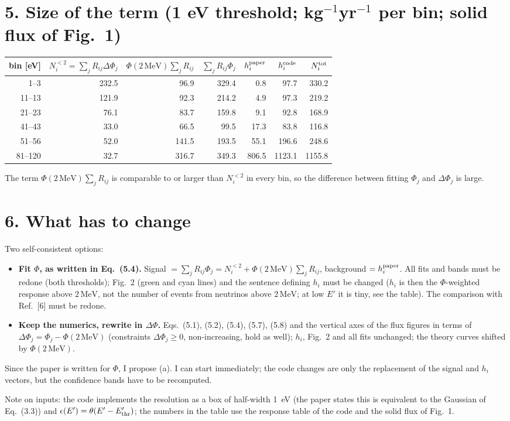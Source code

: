 \documentclass[11pt,a4paper]{article}
\newcommand{\Ep}{E'}
\newcommand{\Phit}{\Phi(2\,\mathrm{MeV})}
\newcommand{\Etwo}{2\,\mathrm{MeV}}
\begin{document}
\section*{5. Size of the term (1 eV threshold; kg$^{-1}$yr$^{-1}$ per bin; solid flux of Fig.~1)}
\begin{center}\small
\begin{tabular}{r rrrrrr}
\toprule
bin [eV] & $N_i^{<2}=\sum_jR_{ij}\Delta\Phi_j$ & $\Phit\sum_jR_{ij}$ & $\sum_jR_{ij}\Phi_j$ & $h_i^{\rm paper}$ & $h_i^{\rm code}$ & $N_i^{\rm tot}$\\
\midrule
   1--3 &   232.5 &    96.9 &   329.4 &     0.8 &    97.7 &   330.2 \\
 11--13 &   121.9 &    92.3 &   214.2 &     4.9 &    97.3 &   219.2 \\
 21--23 &    76.1 &    83.7 &   159.8 &     9.1 &    92.8 &   168.9 \\
 41--43 &    33.0 &    66.5 &    99.5 &    17.3 &    83.8 &   116.8 \\
 51--56 &    52.0 &   141.5 &   193.5 &    55.1 &   196.6 &   248.6 \\
81--120 &    32.7 &   316.7 &   349.3 &   806.5 &  1123.1 &  1155.8 \\
\bottomrule
\end{tabular}
\end{center}
The term $\Phit\sum_jR_{ij}$ is comparable to or larger than $N_i^{<2}$ in every bin, so the difference between fitting
$\Phi_j$ and $\Delta\Phi_j$ is large.

\section*{6. What has to change}
Two self-consistent options:
\begin{itemize}\itemsep1pt
\item[(a)] \textbf{Fit $\Phi$, as written in Eq.~(5.4).} Signal $=\sum_jR_{ij}\Phi_j=N_i^{<2}+\Phit\sum_jR_{ij}$,
background $=h_i^{\rm paper}$. All fits and bands must be redone (both thresholds); Fig.~2 (green and cyan lines) and the sentence
defining $h_i$ must be changed ($h_i$ is then the $\Phi$-weighted response above $\Etwo$, not the number of events from
neutrinos above $\Etwo$; at low $\Ep$ it is tiny, see the table). The comparison with Ref.~[6] must be redone.
\item[(b)] \textbf{Keep the numerics, rewrite in $\Delta\Phi$.} Eqs.~(5.1), (5.2), (5.4), (5.7), (5.8) and the vertical axes of the
flux figures in terms of $\Delta\Phi_j=\Phi_j-\Phit$ (constraints $\Delta\Phi_j\ge0$, non-increasing, hold as well); $h_i$, Fig.~2 and all
fits unchanged; the theory curves shifted by $\Phit$.
\end{itemize}
Since the paper is written for $\Phi$, I propose (a). I can start immediately; the code changes are only the replacement of the
signal and $h_i$ vectors, but the confidence bands have to be recomputed.

\vspace{2mm}\footnotesize
Note on inputs: the code implements the resolution as a box of half-width 1~eV (the paper states this is equivalent to the
Gaussian of Eq.~(3.3)) and $\epsilon(\Ep)=\theta(\Ep-E'_{\rm thr})$; the numbers in the table use the response table of the code and the
solid flux of Fig.~1.
\end{document}
